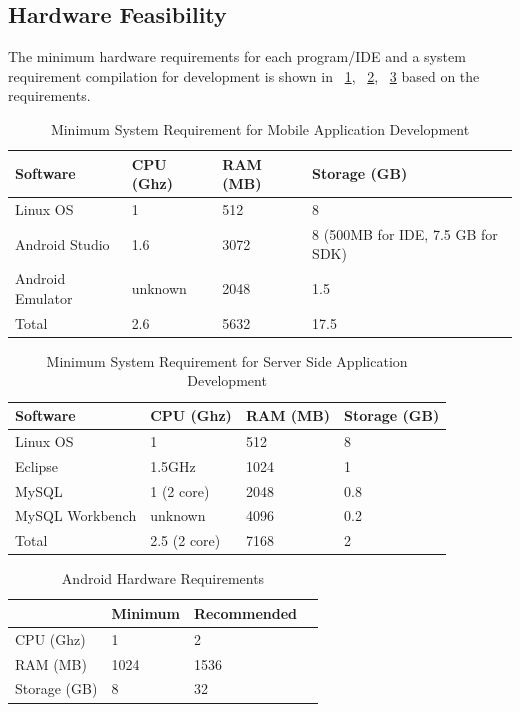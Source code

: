 \subsection{Hardware Feasibility}
The minimum hardware requirements for each program/IDE and
a system requirement compilation for development is shown in ~\ref{minreqmobile}, ~\ref{minreqserver}, ~\ref{androidhardware} based on the requirements.

\begin{table}[!ht]
\centering
\caption{Minimum System Requirement for Mobile Application Development}
\label{minreqmobile}
\begin{tabular}{|l|l|l|l|}
\hline
\textbf{Software}& \textbf{CPU (Ghz)} & \textbf{RAM (MB)}  & \textbf{Storage (GB)} \\ \hline
Linux OS \cite{linuxMinimumSystemRequirements} & 1 & 512 & 8 \\ \hline
Android Studio \cite{androidMinimumSystemRequirements} & 1.6 & 3072  & 8 (500MB for IDE, 7.5 GB for SDK) \\ \hline
Android Emulator \cite{androidMinimumSystemRequirements} & unknown & 2048 & 1.5 \\ \hline
Total & 2.6 & 5632 & 17.5 \\ \hline
\end{tabular}
\end{table}

\begin{table}[!ht]
\centering
\caption{Minimum System Requirement for Server Side Application Development}
\label{minreqserver}
\begin{tabular}{|l|l|l|l|}
\hline
\textbf{Software}& \textbf{CPU (Ghz)} & \textbf{RAM (MB)}  & \textbf{Storage (GB)} \\ \hline
Linux OS \cite{linuxMinimumSystemRequirements} & 1 & 512 & 8 \\ \hline
Eclipse \cite{eclipse} & 1.5GHz & 1024  & 1  \\ \hline
MySQL \cite{mysql} & 1 (2 core) & 2048 & 0.8 \\ \hline
MySQL Workbench\cite{mysql} & unknown & 4096 & 0.2 \\ \hline
Total\cite{mysql} & 2.5 (2 core) & 7168 & 2 \\ \hline
\end{tabular}
\end{table}

\begin{table}[!ht]
\centering
\caption{Android Hardware Requirements}
\label{androidhardware}
\begin{tabular}{|l|l|l|l|}
\hline
            & \textbf{Minimum}    & \textbf{Recommended} \\\hline
CPU (Ghz) & 1      & 2     \\\hline
RAM (MB)      & 1024       & 1536        \\\hline
Storage (GB)   & 8     & 32       \\\hline
\end{tabular}
\end{table}

